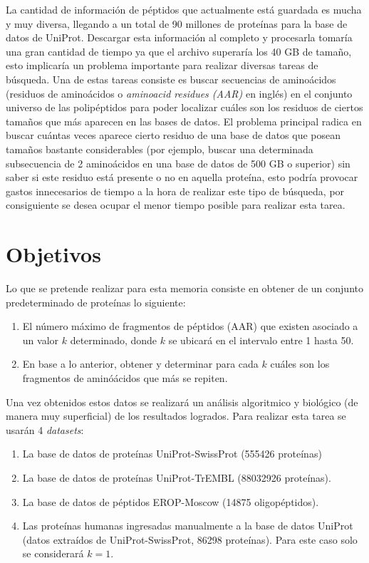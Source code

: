 La cantidad de información de péptidos que actualmente está guardada es mucha y muy diversa, llegando a un total de 90 millones de proteínas para la base de datos de UniProt. Descargar esta información al completo y procesarla tomaría una gran cantidad de tiempo ya que el archivo superaría los 40 GB de tamaño, esto implicaría un problema importante para realizar diversas tareas de búsqueda. Una de estas tareas consiste es buscar secuencias de aminoácidos (residuos de aminoácidos o \textit{aminoacid residues (AAR)} en inglés) en el conjunto universo de las polipéptidos para poder localizar cuáles son los residuos de ciertos tamaños que más aparecen en las bases de datos. El problema principal radica en buscar cuántas veces aparece cierto residuo de una base de datos que posean tamaños bastante considerables (por ejemplo, buscar una determinada subsecuencia de 2 aminoácidos en una base de datos de 500 GB o superior) sin saber si este residuo está presente o no en aquella proteína, esto podría provocar gastos innecesarios de tiempo a la hora de realizar este tipo de búsqueda, por consiguiente se desea ocupar el menor tiempo posible para realizar esta tarea.

\section{Objetivos}

Lo que se pretende realizar para esta memoria consiste en obtener de un conjunto predeterminado de proteínas lo siguiente:

\begin{enumerate}

\item El número máximo de fragmentos de péptidos (AAR) que existen asociado a un valor $k$ determinado, donde $k$ se ubicará en el intervalo entre 1 hasta 50.
\item En base a lo anterior, obtener y determinar para cada $k$ cuáles son los fragmentos de aminóácidos que más se repiten.

\end{enumerate}

Una vez obtenidos estos datos se realizará un análisis algoritmico y biológico (de manera muy superficial) de los resultados logrados. Para realizar esta tarea se usarán 4 \textit{datasets}:
 
\begin{enumerate}

\item La base de datos de proteínas UniProt-SwissProt \cite{swissprot} (555426 proteínas)
\item La base de datos de proteínas UniProt-TrEMBL \cite{trembl} (88032926 proteínas).
\item La base de datos de péptidos EROP-Moscow \cite{eropmoscow} (14875 oligopéptidos).
\item Las proteínas humanas ingresadas manualmente a la base de datos UniProt (datos extraídos de UniProt-SwissProt, 86298 proteínas). Para este caso solo se considerará $k=1$.

\end{enumerate}
